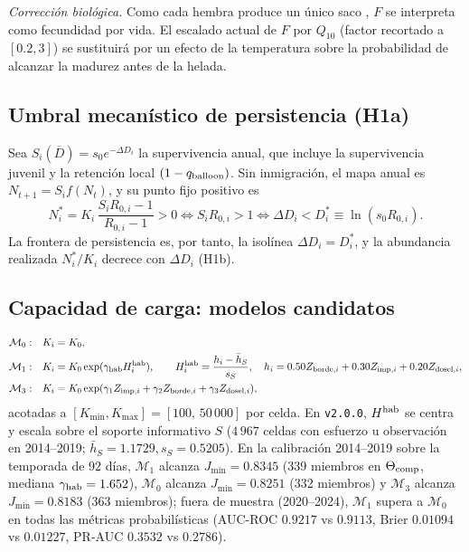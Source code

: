 \documentclass[11pt,letterpaper]{article}
\begin{document}
\textit{Corrección biológica.} Como cada hembra produce un único saco \cite{suzuki2022}, $F$ se interpreta como fecundidad por vida. El escalado actual de $F$ por $Q_{10}$ (factor recortado a $[0.2,3]$) se sustituirá por un efecto de la temperatura sobre la probabilidad de alcanzar la madurez antes de la helada.

\subsection{Umbral mecanístico de persistencia (H1a)}
Sea $S_i(\overline D)=s_0e^{-\Delta D_i}$ la supervivencia anual, que incluye la supervivencia juvenil y la retención local $(1-q_{\rm balloon})$. Sin inmigración, el mapa anual es $N_{t+1}=S_if(N_t)$, y su punto fijo positivo es
\begin{equation}
N^\ast_i=K_i\,\frac{S_iR_{0,i}-1}{R_{0,i}-1}>0\iff S_iR_{0,i}>1\iff \Delta D_i<D^\ast_i\equiv\ln(s_0R_{0,i}).\label{eq:umbral}
\end{equation}
La frontera de persistencia es, por tanto, la isolínea $\Delta D_i=D^\ast_i$, y la abundancia realizada $N^\ast_i/K_i$ decrece con $\Delta D_i$ (H1b).

\subsection{Capacidad de carga: modelos candidatos}
\begin{align}
\mathcal M_0:&\quad K_i=K_0,\\
\mathcal M_1:&\quad K_i=K_0\exp(\gamma_{\rm hab}H^{\rm hab}_i),\qquad H^{\rm hab}_i=\frac{h_i-\bar h_S}{s_S},\quad h_i=0.50Z_{{\rm borde},i}+0.30Z_{{\rm imp},i}+0.20Z_{{\rm dosel},i},\\
\mathcal M_3:&\quad K_i=K_0\exp(\gamma_1Z_{{\rm imp},i}+\gamma_2Z_{{\rm borde},i}+\gamma_3Z_{{\rm dosel},i}),
\end{align}
acotadas a $[K_{\min},K_{\max}]=[100,\,50\,000]$ por celda. En \texttt{v2.0.0}, $H^{\rm hab}$ se centra y escala sobre el soporte informativo $S$ ($4\,967$ celdas con esfuerzo u observación en 2014--2019; $\bar h_S=1.1729, s_S=0.5205$). En la calibración 2014--2019 sobre la temporada de 92 días, $\mathcal M_1$ alcanza $J_{\min}=0.8345$ (339 miembros en $\Theta_{\rm comp}$, mediana $\gamma_{\rm hab}=1.652$), $\mathcal M_0$ alcanza $J_{\min}=0.8251$ (332 miembros) y $\mathcal M_3$ alcanza $J_{\min}=0.8183$ (363 miembros); fuera de muestra (2020--2024), $\mathcal M_1$ supera a $\mathcal M_0$ en todas las métricas probabilísticas (AUC-ROC $0.9217$ vs $0.9113$, Brier $0.01094$ vs $0.01227$, PR-AUC $0.3532$ vs $0.2786$).
\end{document}
